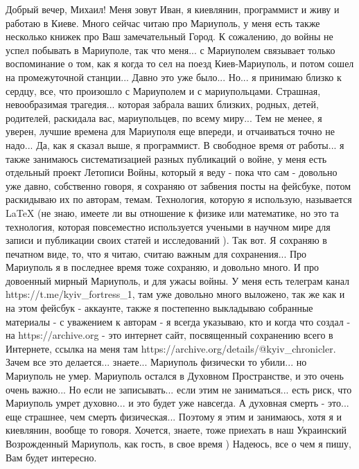  
 
 
 
 

Добрый вечер, Михаил! Меня зовут Иван, я киевлянин, программист и живу и работаю
в Киеве. Много сейчас читаю про Мариуполь, у меня есть также несколько книжек
про Ваш замечательный Город. К сожалению, до войны не успел побывать в
Мариуполе, так что меня... с Мариуполем связывает только воспоминание о том,
как я когда то сел на поезд Киев-Мариуполь, и потом сошел на промежуточной
станции... Давно это уже было... Но... я принимаю близко к сердцу, все, что
произошло с Мариуполем и с мариупольцами. Страшная, невообразимая трагедия...
которая забрала ваших близких, родных, детей, родителей, раскидала вас,
мариупольцев, по всему миру... Тем не менее, я уверен, лучшие времена для
Мариуполя еще впереди, и отчаиваться точно не надо... Да, как я сказал выше, я
программист. В свободное время от работы... я также занимаюсь систематизацией
разных публикаций о войне, у меня есть отдельный проект Летописи Войны, который
я веду - пока что сам - довольно уже давно, собственно говоря, я сохраняю от
забвения посты на фейсбуке, потом раскидываю их по авторам, темам. Технология,
которую я использую, называется LaTeX (не знаю, имеете ли вы отношение к физике
или математике, но это та технология, которая повсеместно используется учеными
в научном мире для записи и публикации своих статей и исследований ). Так вот.
Я сохраняю в печатном виде, то, что я читаю, считаю важным для сохранения...
Про Мариуполь я в последнее время тоже сохраняю, и довольно много. И про
довоенный мирный Мариуполь, и для ужасы войны. У меня есть телеграм канал
https://t.me/kyiv_fortress_1, там уже довольно много выложено, так же как и на
этом фейсбук - аккаунте, также я постепенно выкладываю собранные  материалы - с
уважением к авторам - я всегда указываю, кто и когда что создал - на
https://archive.org - это интернет сайт, посвященный сохранению всего в
Интернете, ссылка на меня там https://archive.org/details/@kyiv_chronicler.
Зачем все это делается... знаете... Мариуполь физически то убили... но
Мариуполь не умер. Мариуполь остался в Духовном Пространстве, и это очень очень
важно... Но если не записывать... если этим не заниматься... есть риск, что
Мариуполь умрет духовно... и это будет уже навсегда. А духовная смерть - это...
еще страшнее, чем смерть физическая... Поэтому я этим и занимаюсь, хотя я и
киевлянин, вообще то говоря. Хочется, знаете, тоже приехать в наш Украинский
Возрожденный Мариуполь, как гость, в свое время ) Надеюсь, все о чем я пишу,
Вам будет интересно. 

